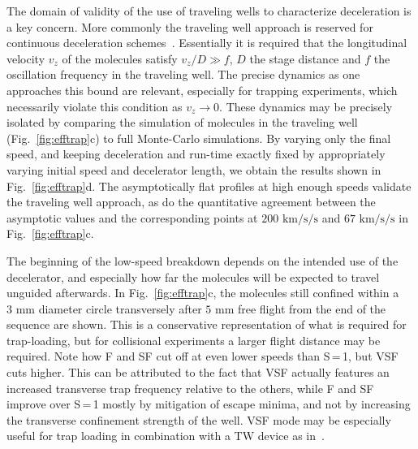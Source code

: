 \documentclass[%
 reprint,
 amsmath,amssymb,
 aps,
prl,
]{revtex4-1}
\begin{document}
The domain of validity of the use of traveling wells to characterize deceleration is a key concern.
More commonly the traveling well approach is reserved for continuous deceleration schemes~\cite{Osterwalder2010,Narevicius2008}.
Essentially it is required that the longitudinal velocity $v_z$ of the molecules satisfy $v_z/D \gg f$, $D$ the stage distance and $f$ the oscillation frequency in the traveling well.
The precise dynamics as one approaches this bound are relevant, especially for trapping experiments, which necessarily violate this condition as $v_z\rightarrow 0$.
These dynamics may be precisely isolated by comparing the simulation of molecules in the traveling well (Fig.~\ref{fig:efftrap}c) to full Monte-Carlo simulations.
By varying only the final speed, and keeping deceleration and run-time exactly fixed by appropriately varying initial speed and decelerator length, we obtain the results shown in Fig.~\ref{fig:efftrap}d.
The asymptotically flat profiles at high enough speeds validate the traveling well approach, as do the quantitative agreement between the asymptotic values and the corresponding points at $200\text{ km/s/s}$ and $67\text{ km/s/s}$ in Fig.~\ref{fig:efftrap}c.

The beginning of the low-speed breakdown depends on the intended use of the decelerator, and especially how far the molecules will be expected to travel unguided afterwards.
In Fig.~\ref{fig:efftrap}c, the molecules still confined within a $3\text{ mm}$ diameter circle transversely after $5\text{ mm}$ free flight from the end of the sequence are shown. 
This is a conservative representation of what is required for trap-loading, but for collisional experiments a larger flight distance may be required.
Note how F and SF cut off at even lower speeds than S\,=\,1, but VSF cuts higher. 
This can be attributed to the fact that VSF actually features an increased transverse trap frequency relative to the others, while F and SF improve over S\,=\,1 mostly by mitigation of escape minima, and not by increasing the transverse confinement strength of the well.
VSF mode may be especially useful for trap loading in combination with a TW device as in~\cite{Quintero-Perez2013}.
\end{document}

